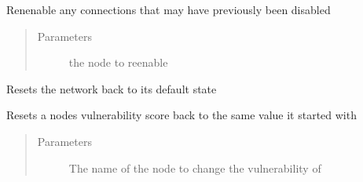 \documentclass[letterpaper,10pt,english]{sphinxmanual}
\begin{document}
\begin{fulllineitems}
\begin{fulllineitems}
\end{fulllineitems}


\begin{fulllineitems}
\label{\detokenize{source/yawning_titan.envs.generic.core:yawning_titan.envs.generic.core.network_interface.NetworkInterface.reconnect_node}}
\sphinxAtStartPar
Ren\sphinxhyphen{}enable any connections that may have previously been disabled
\begin{quote}\begin{description}
\item[{Parameters}] \leavevmode
\sphinxAtStartPar
{} \textendash{} the node to re\sphinxhyphen{}enable

\end{description}\end{quote}

\end{fulllineitems}


\begin{fulllineitems}
\label{\detokenize{source/yawning_titan.envs.generic.core:yawning_titan.envs.generic.core.network_interface.NetworkInterface.reset}}
\sphinxAtStartPar
Resets the network back to its default state

\end{fulllineitems}


\begin{fulllineitems}
\label{\detokenize{source/yawning_titan.envs.generic.core:yawning_titan.envs.generic.core.network_interface.NetworkInterface.reset_single_node_vulnerability}}
\sphinxAtStartPar
Resets a nodes vulnerability score back to the same value it started with
\begin{quote}\begin{description}
\item[{Parameters}] \leavevmode
\sphinxAtStartPar
{} \textendash{} The name of the node to change the vulnerability of


\end{description}
\end{quote}
\end{fulllineitems}
\end{fulllineitems}
\end{document}
